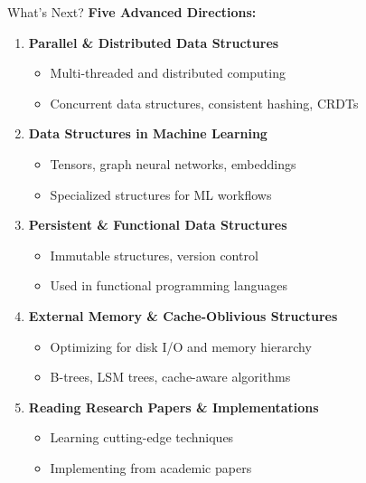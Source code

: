 \documentclass[aspectratio=169,xcolor=dvipsnames]{beamer}
\begin{document}
\begin{frame}{What's Next?}
  \textbf{Five Advanced Directions:}
  \begin{enumerate}
    \item \textbf{Parallel \& Distributed Data Structures}
    \begin{itemize}
      \item Multi-threaded and distributed computing
      \item Concurrent data structures, consistent hashing, CRDTs
    \end{itemize}

    \vspace{0.2cm}
    \item \textbf{Data Structures in Machine Learning}
    \begin{itemize}
      \item Tensors, graph neural networks, embeddings
      \item Specialized structures for ML workflows
    \end{itemize}

    \vspace{0.2cm}
    \item \textbf{Persistent \& Functional Data Structures}
    \begin{itemize}
      \item Immutable structures, version control
      \item Used in functional programming languages
    \end{itemize}

    \vspace{0.2cm}
    \item \textbf{External Memory \& Cache-Oblivious Structures}
    \begin{itemize}
      \item Optimizing for disk I/O and memory hierarchy
      \item B-trees, LSM trees, cache-aware algorithms
    \end{itemize}

    \vspace{0.2cm}
    \item \textbf{Reading Research Papers \& Implementations}
    \begin{itemize}
      \item Learning cutting-edge techniques
      \item Implementing from academic papers
    \end{itemize}
  \end{enumerate}
\end{frame}
\end{document}
